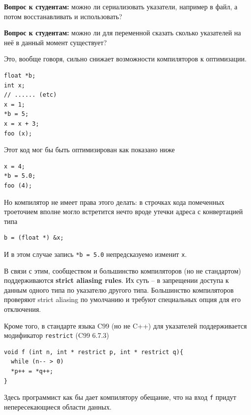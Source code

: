 \documentclass[a4paper,12pt,oneside]{book}
\newif\ifanswers
\begin{document}
\textbf{Вопрос к студентам:} можно ли сериализовать указатели, например в файл, а потом восстанавливать и использовать?

\ifanswers
Ответ: да, в течении срока жизни того, на что они указывают.
\fi

\textbf{Вопрос к студентам:} можно ли для переменной сказать сколько указателей на неё в данный момент существует?

\ifanswers
Ответ: увы, нет. Никакая переменная не ``знает'' о том, что кто-то взял её адрес и т.п.
\fi

Это, вообще говоря, сильно снижает возможности компиляторов к оптимизации.

\begin{lstlisting}
float *b; 
int x;
// ...... (etc)
x = 1;
*b = 5;
x = x + 3;
foo (x);
\end{lstlisting}

Этот код мог бы быть оптимизирован как показано ниже

\begin{lstlisting}
x = 4;
*b = 5.0;
foo (4);
\end{lstlisting}

Но компилятор не имеет права этого делать: в строчках кода помеченных троеточием вполне могло встретится нечто вроде утечки адреса с конвертацией типа

\begin{lstlisting}
b = (float *) &x;
\end{lstlisting}

И в этом случае запись \lstinline!*b = 5.0! непредсказуемо изменит \lstinline!x!.

В связи с этим, сообществом и большинство компиляторов (но не стандартом) поддерживаются \textbf{strict aliasing rules}\label{StrictAliasing}. Их суть -- в запрещении доступа к данным одного типа по указателю другого типа. Большинство компиляторов проверяют strict aliasing по умолчанию и требуют специальных опция для его отключения.

Кроме того, в стандарте языка C99 (но не C++) для указателей поддерживается модификатор \lstinline!restrict! (C99 6.7.3)

\begin{lstlisting}
void f (int n, int * restrict p, int * restrict q){
  while (n-- > 0)
  *p++ = *q++;
}
\end{lstlisting}

Здесь программист как бы дает компилятору обещание, что на вход \lstinline!f! придут непересекающиеся области данных.
\end{document}
